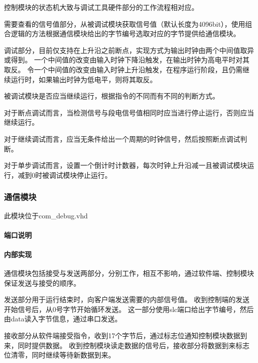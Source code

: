                 控制模块的状态机大致与调试工具硬件部分的工作流程相对应。

                需要查看的信号值部分，从被调试模块获取信号值（默认长度为4096bit），使用组合逻辑的方法根据通信模块给出的字节编号选取对应的字节提供给通信模块。

                调试部分，目前仅支持在上升沿之前断点，实现方式为输出时钟由两个中间值取异或得到。%
                一个中间值的改变由输入时钟下降沿触发，在输出时钟为高电平时对其取反。%
                令一个中间值的改变由输入时钟上升沿触发，在程序运行阶段，且仍需继续运行时，如果输出时钟为低电平，则将其取反。

                被调试模块是否应当继续运行，根据指令的不同而有不同的判断方式。

                对于断点调试而言，当检测信号与段电信号值相同时应当进行停止运行，否则应当继续运行。

                对于继续调试而言，应当无条件给出一个周期的时钟信号，然后按照断点调试判断。

                对于单步调试而言，设置一个倒计时计数器，每次时钟上升沿减一且被调试模块运行，减到0时被调试模块停止运行。

        \subsubsection{通信模块}
            此模块位于com\_debug.vhd

            \paragraph{端口说明}
            \mbox{}

                

            \paragraph{内部实现}
            \mbox{}

                通信模块包括接受与发送两部分，分别工作，相互不影响，通过软件端、控制模块保证发送与接受的顺序。

                发送部分用于运行结束时，向客户端发送需要的内部信号值。%
                收到控制端的发送开始信号后，从0号字节开始循环发送。%
                这一部分使用slc端口给出字节编号，然后由data读入字节信息，通过串口发送。

                接收部分从软件端接受指令，收到17个字节后，通过标志位通知控制模块数据到来，同时提供数据。%
                收到控制模块读走数据的信号后，接收部分将数据到来标志位清零，同时继续等待新数据到来。


